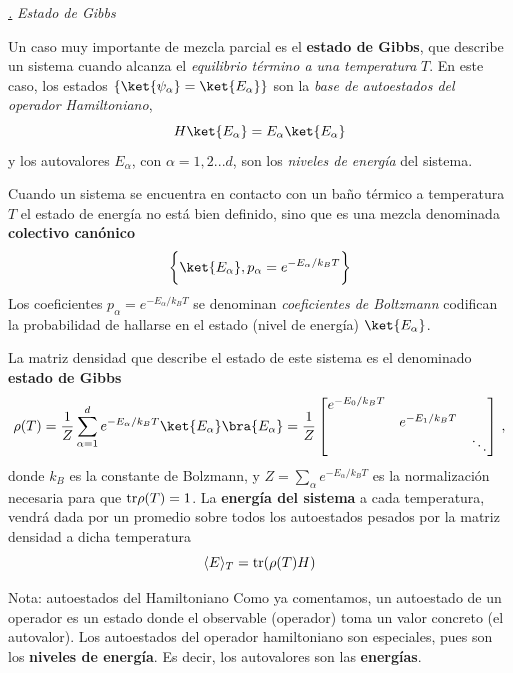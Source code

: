 \documentclass[a4paper,11pt]{book} %
\numberwithin{equation}{chapter}
\def\subsubiContadorIt{\par\addtocounter{subsubsection}{1}\underline{\it\thesubsubsection.}\hskip0.5cm \setcounter{subsubsubsectionIt}{0}}
\newcommand{\SubsubiIt}[1]{
		\subsubiContadorIt \textit{#1}
	}
\newcounter{subsubsubsectionIt}[subsubsection]
\begin{document}
			\SubsubiIt{Estado de Gibbs}


Un caso muy importante de mezcla parcial es el \textbf{estado de Gibbs}, que describe un sistema cuando alcanza el \textit{equilibrio término a una temperatura }$T$. En este caso, los estados $\{\ket{\psi_\alpha}= \ket{E_\alpha}\}$ son la \textit{base de autoestados del operador Hamiltoniano},
	\begin{equation}
	H\ket{E_\alpha} = E_\alpha \ket{E_\alpha}
	\end{equation}
y los autovalores $E_\alpha$, con $\alpha = 1,2...d$, son los \textit{niveles de energía} del sistema. 

Cuando un sistema se encuentra en contacto con un baño térmico a temperatura $T$ el estado de energía no está bien definido, sino que es una mezcla denominada \textbf{colectivo canónico}
	\begin{equation}
	\left\{\rule{0mm}{5mm}\ket{E_\alpha}, p_\alpha = e^{-E_\alpha/k_BT}\right\}
	\end{equation}
Los coeficientes $p_\alpha = e^{-E_\alpha/k_BT}$ se denominan \textit{coeficientes de Boltzmann}  codifican la probabilidad  de hallarse en el estado (nivel de energía) $\ket{E_\alpha}$. 

La matriz densidad que describe el estado de este sistema es el denominado \textbf{estado de Gibbs}
	\begin{equation}
	\rho(T) = \frac{1}{Z}\sum_{\alpha=1}^d e^{-E_\alpha/k_BT} \ket{E_\alpha}\bra{E_\alpha} = \frac{1}{Z} \begin{bmatrix}e^{-E_0/k_BT}&  & \\ & e^{-E_1/k_BT} & \\ &  &\ddots  \end{bmatrix} \, ,
	\end{equation}
donde $k_B$ es la constante de Bolzmann, y  $Z =\sum_\alpha e^{-E_\alpha/k_BT}$ es la normalización necesaria para que ${\rm tr}\rho(T) = 1$. La \textbf{energía del sistema} a cada temperatura, vendrá dada por un promedio sobre todos los autoestados pesados por la matriz densidad a dicha temperatura
	\begin{equation}
	\langle E \rangle_T = {\rm tr} (\rho(T) H)
	\end{equation}

\begin{mybox_blue}{Nota: autoestados del Hamiltoniano}
Como ya comentamos, un autoestado de un operador es un estado donde el observable (operador) toma un valor concreto (el autovalor). Los autoestados del operador hamiltoniano son especiales, pues son los \textbf{niveles de energía}. Es decir, los autovalores son las \textbf{energías}. 
\end{mybox_blue}
\end{document}
